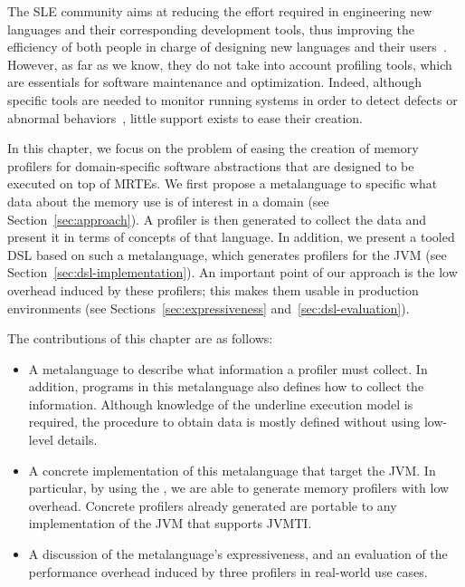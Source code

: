 
The \gls{SLE} community aims at reducing the effort required in engineering new languages and their corresponding development tools, thus improving the efficiency of both people in charge of designing new languages and their users~\cite{sle}. 
However, as far as we know, they do not take into account profiling tools, which are essentials for software maintenance and optimization.
Indeed, although specific tools are needed to monitor running systems in order to detect defects or abnormal behaviors~\cite{duesterwald2000software, Jovic:2011:CMY:2076021.2048081},
little support exists to ease their creation.

In this chapter, we focus on the problem of easing the creation of memory profilers for domain-specific software abstractions that are designed to be executed on top of MRTEs. 
We first propose a metalanguage to specific what data about the memory use is of interest in a domain (see Section~\ref{sec:approach}).
A profiler is then generated to collect the data and present it in terms of concepts of that language. 
In addition, we present a tooled DSL based on such a metalanguage, which generates profilers for the JVM (see Section~\ref{sec:dsl-implementation}).
An important point of our approach is the low overhead induced by these profilers; this makes them usable in production environments (see Sections~\ref{sec:expressiveness} and~\ref{sec:dsl-evaluation}).

The contributions of this chapter are as follows:
\begin{itemize}
\item A metalanguage to describe what information a profiler must collect.
In addition, programs in this metalanguage also defines how to collect the information.
Although knowledge of the underline execution model is required, the procedure to obtain data is mostly defined without using low-level details.  

\item A concrete implementation of this metalanguage that target the JVM.
In particular, by using the , we are able to generate memory profilers with low overhead.
Concrete profilers already generated are portable to any implementation of the JVM that supports JVMTI.

\item A discussion of the metalanguage's expressiveness, and an evaluation of the performance overhead induced by three profilers in real-world use cases.
\end{itemize}